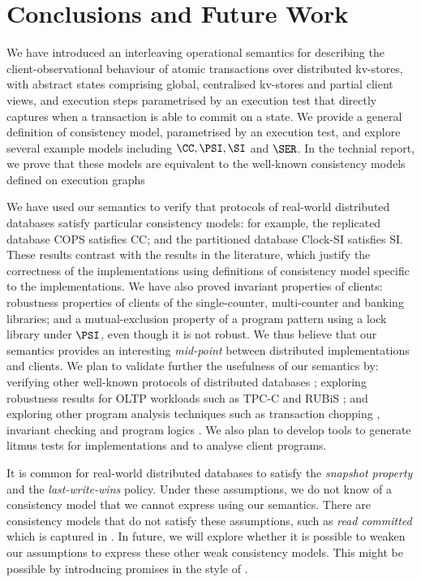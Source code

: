 

\section{Conclusions and Future Work}
\label{sec:conclusions}

We have introduced an  interleaving operational semantics for
describing the client-observational behaviour of atomic
transactions over distributed kv-stores, with abstract states 
comprising global, centralised kv-stores and  partial
client views, and execution steps parametrised by an execution test
that directly 
captures  when a transaction is able  to commit on a state.
We provide a general
definition of consistency model, parametrised by an execution test,
and explore several example models including  \( \CC, \PSI, \SI \) and \( \SER \).
In the technial report, we prove  that  these models are 
equivalent to the 
well-known consistency models defined on  execution graphs \cite{adya,ev_transactions}

We have used our semantics to verify that protocols of real-world
distributed databases satisfy particular consistency models: for
example, the replicated database COPS \cite{cops} satisfies CC; and the
partitioned database Clock-SI \cite{clocksi} satisfies SI. These results
contrast with the results in the literature, which justify the
correctness of the implementations using definitions of consistency
model specific to the implementations.  We have also proved invariant
properties of clients: robustness properties of clients of the
single-counter, multi-counter and banking libraries; and a
mutual-exclusion property of a program pattern using a lock library
under \( \PSI \), even though it is not robust.  We thus believe that our
semantics provides an interesting \emph{mid-point} between distributed
implementations and clients.  We plan to validate further the
usefulness of our semantics by: verifying other well-known protocols
of distributed databases \cite{ramp,redblue,eiger,wren}; exploring
robustness results for OLTP workloads such as TPC-C \cite{tpcc} and
RUBiS \cite{rubis}; and exploring other program analysis techniques
such as transaction chopping \cite{psi-chopping,chopping}, invariant
checking \cite{cise,repliss} and program logics \cite{alonetogether}.
We also plan to develop tools to generate litmus tests for
implementations and to analyse client programs.


It is common for real-world distributed databases to satisfy the
\emph{snapshot property} and the \emph{last-write-wins} policy. 
Under these assumptions, we do not know of a consistency
model that we cannot express using our semantics. 
There are consistency models that do not satisfy these assumptions,
such as \emph{read committed} \cite{ramp} which is  captured in \cite{seebelieve}. 
In future, we  will explore whether it is possible to weaken our
assumptions to express these 
other 
weak consistency models. This might be possible by introducing promises 
in the style of \cite{promises}. 


